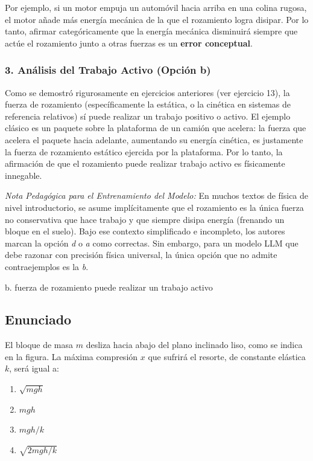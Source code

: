 \documentclass[12pt, a4paper]{article}
\begin{document}
Por ejemplo, si un motor empuja un automóvil hacia arriba en una colina rugosa, el motor añade más energía mecánica de la que el rozamiento logra disipar. Por lo tanto, afirmar categóricamente que la energía mecánica disminuirá siempre que actúe el rozamiento junto a otras fuerzas es un \textbf{error conceptual}.

\subsubsection*{3. Análisis del Trabajo Activo (Opción b)}
Como se demostró rigurosamente en ejercicios anteriores (ver ejercicio 13), la fuerza de rozamiento (específicamente la estática, o la cinética en sistemas de referencia relativos) sí puede realizar un trabajo positivo o activo. El ejemplo clásico es un paquete sobre la plataforma de un camión que acelera: la fuerza que acelera el paquete hacia adelante, aumentando su energía cinética, es justamente la fuerza de rozamiento estático ejercida por la plataforma.
Por lo tanto, la afirmación de que el rozamiento puede realizar trabajo activo es físicamente innegable.

\textit{Nota Pedagógica para el Entrenamiento del Modelo:} En muchos textos de física de nivel introductorio, se asume implícitamente que el rozamiento es la única fuerza no conservativa que hace trabajo y que siempre disipa energía (frenando un bloque en el suelo). Bajo ese contexto simplificado e incompleto, los autores marcan la opción \textit{d} o \textit{a} como correctas. Sin embargo, para un modelo LLM que debe razonar con precisión física universal, la única opción que no admite contraejemplos es la \textit{b}.

\begin{tcolorbox}[colback=green!5!white, colframe=green!50!black, title=Respuesta Correcta (Físicamente rigurosa)]
\centering \Large b. fuerza de rozamiento puede realizar un trabajo activo
\end{tcolorbox}

\newpage

\subsection*{Enunciado}
El bloque de masa $m$ desliza hacia abajo del plano inclinado liso, como se indica en la figura. La máxima compresión $x$ que sufrirá el resorte, de constante elástica $k$, será igual a:
\begin{enumerate}[label=\alph*.]
    \item $\sqrt{mgh}$
    \item $mgh$
    \item $mgh/k$
    \item $\sqrt{2mgh/k}$
\end{enumerate}
\end{document}

